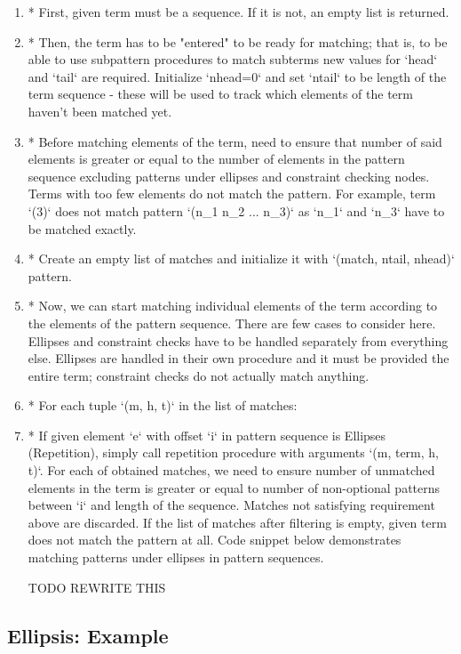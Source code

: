 \begin{enumerate}
\item
* First, given term must be a sequence. If it is not, an empty list is returned.
\item
* Then, the term has to be "entered" to be ready for matching; that is, to be able to use subpattern procedures to match subterms new values for `head` and `tail` are required. Initialize `nhead=0` and set `ntail` to be length of the term sequence - these will be used to track which elements of the term haven't been matched yet.
\item
* Before matching elements of the term, need to ensure that number of said elements is greater or equal to the number of elements in the pattern sequence excluding patterns under ellipses and constraint checking nodes. Terms with too few elements do not match the pattern. For example, term `(3)` does not match pattern `(n\_1 n\_2 ... n\_3)` as `n\_1` and `n\_3` have to be matched exactly.
\item
* Create an empty list of matches and initialize it with `(match, ntail, nhead)` pattern.
\item
* Now, we can start matching individual elements of the term according to the elements of the pattern sequence. There are few cases to consider here. Ellipses and constraint checks have to be handled separately from everything else.  Ellipses are handled in their own procedure and it must be provided the entire term; constraint checks do not actually match anything.
\item
* For each tuple `(m, h, t)` in the list of matches:
\item
* If given element `e` with offset `i` in pattern sequence is Ellipses (Repetition), simply call repetition procedure with arguments `(m, term, h, t)`. For each of obtained matches, we need to ensure number of unmatched elements in the term is greater or equal to number of non-optional patterns between `i` and length of the sequence. Matches not satisfying requirement above are discarded. If the list of matches after filtering is empty, given term does not match the pattern at all. Code snippet below demonstrates matching patterns under ellipses in pattern sequences.

TODO REWRITE THIS 
\end{enumerate}

\subsection{Ellipsis: Example}


